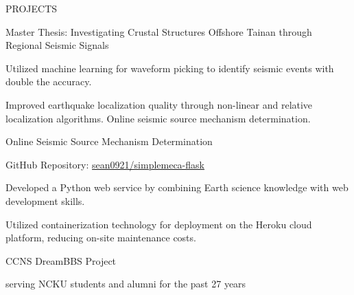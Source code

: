 \documentclass{resume} %
\begin{document}
\begin{rSection}{PROJECTS}


\begin{rSubsection}{Master Thesis: Investigating Crustal Structures Offshore Tainan through Regional Seismic Signals}{}{}{}
\item Utilized machine learning for waveform picking to identify seismic events with double the accuracy.
\item Improved earthquake localization quality through non-linear and relative localization algorithms. Online seismic source mechanism determination.
\end{rSubsection}
\begin{rSubsection}{Online Seismic Source Mechanism Determination}{}{}{}
\item GitHub Repository: \href{https://github.com/sean0921/simplemeca-flask}{sean0921/simplemeca-flask}
\item Developed a Python web service by combining Earth science knowledge with web development skills.
\item Utilized containerization technology for deployment on the Heroku cloud platform, reducing on-site maintenance costs.
\end{rSubsection}
\begin{rSubsection}{CCNS DreamBBS Project}{}{}{}
\item serving NCKU students and alumni for the past 27 years
\end{rSubsection}
\end{rSection}

\end{document}
